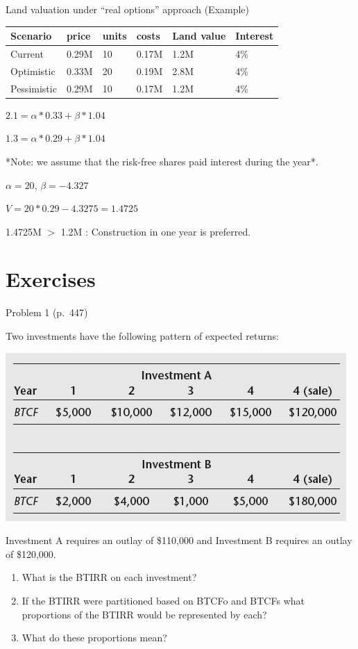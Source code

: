 \documentclass[ignorenonframetext,]{beamer}
\providecommand{\tightlist}{%
\setlength{\itemsep}{0pt}\setlength{\parskip}{0pt}}
\begin{document}
\begin{frame}{Land valuation under ``real options'' approach (Example)}

\begin{longtable}[]{@{}llllll@{}}
\toprule
Scenario & price & units & costs & Land value & Interest\tabularnewline
\midrule
\endhead
Current & 0.29M & 10 & 0.17M & 1.2M & 4\%\tabularnewline
Optimistic & 0.33M & 20 & 0.19M & 2.8M & 4\%\tabularnewline
Pessimistic & 0.29M & 10 & 0.17M & 1.2M & 4\%\tabularnewline
\bottomrule
\end{longtable}

\(2.1 = \alpha*0.33 + \beta*1.04\)

\(1.3 = \alpha*0.29 + \beta*1.04\)

\footnotesize
*Note: we assume that the risk-free shares paid interest during the
year*. \small

\(\alpha = 20\), \(\beta = -4.327\)

\(V = 20*0.29 - 4.3275 = 1.4725\)

1.4725M \(>\) 1.2M : Construction in one year is preferred.

\normalsize

\end{frame}

\section{Exercises}\label{exercises}

\begin{frame}{Problem 1 (p.~447)}

Two investments have the following pattern of expected returns:

\begin{center}\includegraphics[width=200 px]{p1_447} \end{center}

Investment A requires an outlay of \$110,000 and Investment B requires
an outlay of \$120,000.

\begin{enumerate}
\def\labelenumi{\arabic{enumi}.}
\tightlist
\item
  What is the BTIRR on each investment?
\item
  If the BTIRR were partitioned based on BTCFo and BTCFs what
  proportions of the BTIRR would be represented by each?
\item
  What do these proportions mean?
\end{enumerate}

\end{frame}
\end{document}
